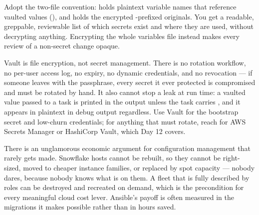 \begin{prodtip}
Adopt the two-file convention:  holds plaintext variable names that reference vaulted values (), and  holds the encrypted -prefixed originals. You get a readable, greppable, reviewable list of which secrets exist and where they are used, without decrypting anything. Encrypting the whole variables file instead makes every review of a non-secret change opaque.
\end{prodtip}

\begin{secwarn}
Vault is file encryption, not secret management. There is no rotation workflow, no per-user access log, no expiry, no dynamic credentials, and no revocation --- if someone leaves with the passphrase, every secret it ever protected is compromised and must be rotated by hand. It also cannot stop a leak at run time: a vaulted value passed to a task is printed in the output unless the task carries , and it appears in plaintext in  debug output regardless. Use Vault for the bootstrap secret and low-churn credentials; for anything that must rotate, reach for AWS Secrets Manager or HashiCorp Vault, which Day 12 covers.
\end{secwarn}

\begin{costnote}
There is an unglamorous economic argument for configuration management that rarely gets made. Snowflake hosts cannot be rebuilt, so they cannot be right-sized, moved to cheaper instance families, or replaced by spot capacity --- nobody dares, because nobody knows what is on them. A fleet that is fully described by roles can be destroyed and recreated on demand, which is the precondition for every meaningful cloud cost lever. Ansible's payoff is often measured in the migrations it makes possible rather than in hours saved.
\end{costnote}

